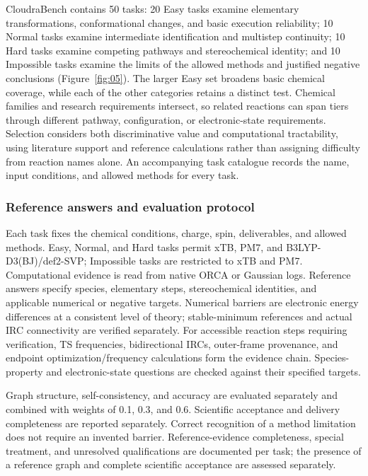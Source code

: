 CloudraBench contains 50 tasks: 20 Easy tasks examine elementary transformations, conformational changes, and basic execution reliability; 10 Normal tasks examine intermediate identification and multistep continuity; 10 Hard tasks examine competing pathways and stereochemical identity; and 10 Impossible tasks examine the limits of the allowed methods and justified negative conclusions (Figure~\ref{fig:05}). The larger Easy set broadens basic chemical coverage, while each of the other categories retains a distinct test. Chemical families and research requirements intersect, so related reactions can span tiers through different pathway, configuration, or electronic-state requirements. Selection considers both discriminative value and computational tractability, using literature support and reference calculations rather than assigning difficulty from reaction names alone. An accompanying task catalogue records the name, input conditions, and allowed methods for every task.

\subsubsection{Reference answers and evaluation protocol}

Each task fixes the chemical conditions, charge, spin, deliverables, and allowed methods. Easy, Normal, and Hard tasks permit xTB, PM7, and B3LYP-D3(BJ)/def2-SVP; Impossible tasks are restricted to xTB and PM7. Computational evidence is read from native ORCA or Gaussian logs. Reference answers specify species, elementary steps, stereochemical identities, and applicable numerical or negative targets. Numerical barriers are electronic energy differences at a consistent level of theory; stable-minimum references and actual IRC connectivity are verified separately. For accessible reaction steps requiring verification, TS frequencies, bidirectional IRCs, outer-frame provenance, and endpoint optimization/frequency calculations form the evidence chain. Species-property and electronic-state questions are checked against their specified targets.

Graph structure, self-consistency, and accuracy are evaluated separately and combined with weights of 0.1, 0.3, and 0.6. Scientific acceptance and delivery completeness are reported separately. Correct recognition of a method limitation does not require an invented barrier. Reference-evidence completeness, special treatment, and unresolved qualifications are documented per task; the presence of a reference graph and complete scientific acceptance are assessed separately.

